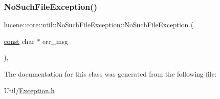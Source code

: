 \subsubsection{\texorpdfstring{No\+Such\+File\+Exception()}{NoSuchFileException()}\hspace{0.1cm}{\footnotesize\ttfamily [3/3]}}
{\footnotesize\ttfamily lucene\+::core\+::util\+::\+No\+Such\+File\+Exception\+::\+No\+Such\+File\+Exception (\begin{DoxyParamCaption}\item[{\mbox{\hyperlink{ZlibCrc32_8h_a2c212835823e3c54a8ab6d95c652660e}{const}} char $\ast$}]{err\+\_\+msg }\end{DoxyParamCaption})\hspace{0.3cm}{\ttfamily [inline]}, {\ttfamily [explicit]}}



The documentation for this class was generated from the following file\+:\begin{DoxyCompactItemize}
\item 
Util/\mbox{\hyperlink{Util_2Exception_8h}{Exception.\+h}}\end{DoxyCompactItemize}
